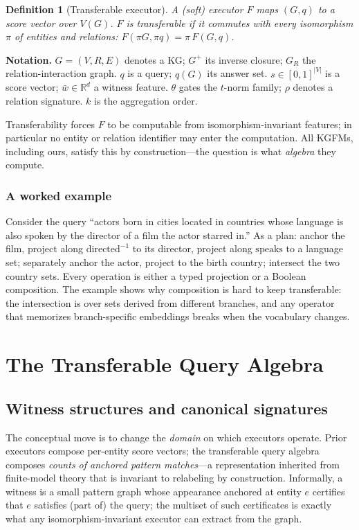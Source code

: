 \documentclass[journal]{IEEEtran}
\newtheorem{definition}{Definition}
\begin{document}
\begin{definition}[Transferable executor]\label{def:executor}
A (soft) executor $F$ maps $(G,q)$ to a score vector over $V(G)$. $F$ is
\emph{transferable} if it commutes with every isomorphism $\pi$ of entities
and relations: $F(\pi G,\pi q)=\pi\,F(G,q)$.
\end{definition}

\textbf{Notation.} $G=(V,R,E)$ denotes a KG; $G^+$ its inverse closure;
$G_R$ the relation-interaction graph. $q$ is a query; $q(G)$ its answer
set. $s\in[0,1]^{|V|}$ is a score vector; $\bar w\in\mathbb{R}^d$ a
witness feature. $\theta$ gates the $t$-norm family; $\rho$ denotes a
relation signature. $k$ is the aggregation order.

Transferability forces $F$ to be computable from isomorphism-invariant
features; in particular no entity or relation identifier may enter the
computation. All KGFMs, including ours, satisfy this by construction---the
question is what \emph{algebra} they compute.

\subsubsection*{A worked example} Consider the query
``actors born in cities located in countries whose language is also
spoken by the director of a film the actor starred in.'' As a plan:
anchor the film, project along $\mathrm{directed}^{-1}$ to its director,
project along $\mathrm{speaks}$ to a language set; separately anchor the
actor, project to the birth country; intersect the two country sets.
Every operation is either a typed projection or a Boolean composition.
The example shows why composition is hard to keep transferable: the
intersection is over sets derived from different branches, and any
operator that memorizes branch-specific embeddings breaks when the
vocabulary changes.

\section{The Transferable Query Algebra}\label{sec:theory}

\subsection{Witness structures and canonical signatures}

The conceptual move is to change the \emph{domain} on which executors
operate. Prior executors compose per-entity score vectors; the
transferable query algebra composes \emph{counts of anchored pattern
matches}---a representation inherited from finite-model theory that is
invariant to relabeling by construction. Informally, a witness is a small
pattern graph whose appearance anchored at entity $e$ certifies that $e$
satisfies (part of) the query; the multiset of such certificates is
exactly what any isomorphism-invariant executor can extract from the
graph.
\end{document}
